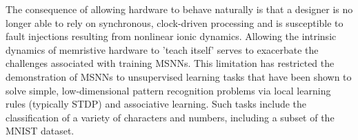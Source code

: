 
\noindent The consequence of allowing hardware to behave naturally is that a designer is no longer able to rely on synchronous, clock-driven processing and is susceptible to fault injections resulting from nonlinear ionic dynamics. Allowing the intrinsic dynamics of memristive hardware to 'teach itself' serves to exacerbate the challenges associated with training MSNNs. This limitation has restricted the demonstration of MSNNs to unsupervised learning tasks that have been shown to solve simple, low-dimensional pattern recognition problems via local learning rules (typically STDP) and associative learning. Such tasks include the classification of a variety of characters and numbers, including a subset of the MNIST dataset. \\





